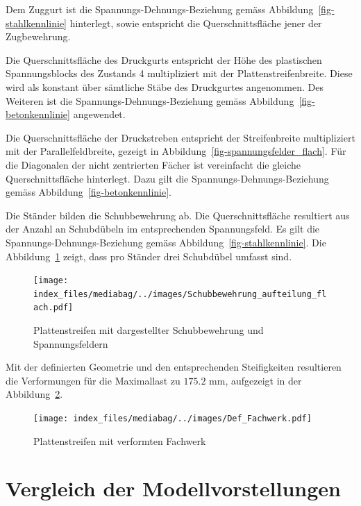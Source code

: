 \documentclass[
  12pt,
  letterpaper,
  egregdoesnotlikesansseriftitles]{scrreprt}
\begin{document}
Dem Zuggurt ist die Spannungs-Dehnungs-Beziehung gemäss
Abbildung~\ref{fig-stahlkennlinie} hinterlegt, sowie entspricht die
Querschnittsfläche jener der Zugbewehrung.

Die Querschnittsfläche des Druckgurts entspricht der Höhe des
plastischen Spannungsblocks des Zustands 4 multipliziert mit der
Plattenstreifenbreite. Diese wird als konstant über sämtliche Stäbe des
Druckgurtes angenommen. Des Weiteren ist die
Spannungs-Dehnungs-Beziehung gemäss Abbildung~\ref{fig-betonkennlinie}
angewendet.

Die Querschnittsfläche der Druckstreben entspricht der Streifenbreite
multipliziert mit der Parallelfeldbreite, gezeigt in
Abbildung~\ref{fig-spannungsfelder_flach}. Für die Diagonalen der nicht
zentrierten Fächer ist vereinfacht die gleiche Querschnittsfläche
hinterlegt. Dazu gilt die Spannungs-Dehnungs-Beziehung gemäss
Abbildung~\ref{fig-betonkennlinie}.

Die Ständer bilden die Schubbewehrung ab. Die Querschnittsfläche
resultiert aus der Anzahl an Schubdübeln im entsprechenden
Spannungsfeld. Es gilt die Spannungs-Dehnungs-Beziehung gemäss
Abbildung~\ref{fig-stahlkennlinie}. Die
Abbildung~\ref{fig-schubbew_fw_flach} zeigt, dass pro Ständer drei
Schubdübel umfasst sind.

\begin{figure}[H]

{\centering \texttt{[image: index\_files/mediabag/../images/Schubbewehrung\_aufteilung\_flach.pdf]}

}

\caption{\label{fig-schubbew_fw_flach}Plattenstreifen mit dargestellter
Schubbewehrung und Spannungsfeldern}

\end{figure}

Mit der definierten Geometrie und den entsprechenden Steifigkeiten
resultieren die Verformungen für die Maximallast zu
\(175.2 \text{ mm}\), aufgezeigt in der
Abbildung~\ref{fig-deformation_fw}.

\begin{figure}[H]

{\centering \texttt{[image: index\_files/mediabag/../images/Def\_Fachwerk.pdf]}

}

\caption{\label{fig-deformation_fw}Plattenstreifen mit verformten
Fachwerk}

\end{figure}

\hypertarget{vergleich-der-modellvorstellungen}{%
\section{Vergleich der
Modellvorstellungen}\label{vergleich-der-modellvorstellungen}}
\end{document}
